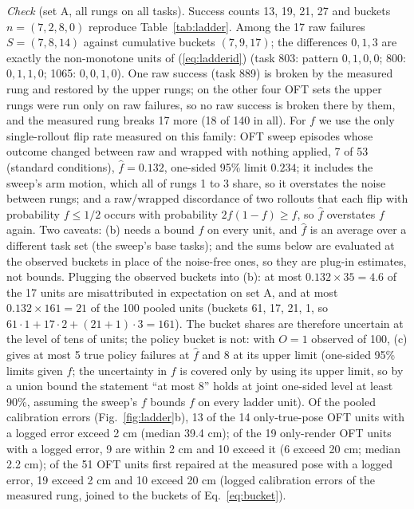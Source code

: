 \documentclass{article}
\begin{document}
\emph{Check} (set A, all rungs on all tasks).
Success counts 13, 19, 21, 27 and buckets $n = (7, 2, 8, 0)$ reproduce Table~\ref{tab:ladder}. Among the 17 raw
failures $S = (7, 8, 14)$ against cumulative buckets $(7, 9, 17)$; the differences $0, 1, 3$ are exactly the
non-monotone units of (\ref{eq:ladderid}) (task 803: pattern $0,1,0,0$; 800: $0,1,1,0$; 1065: $0,0,1,0$). One raw
success (task 889) is broken by the measured rung and restored by the upper rungs; on the other four OFT sets the upper
rungs were run only on raw failures, so no raw success is broken there by them, and the measured rung breaks 17 more
(18 of 140 in all). For $f$ we
use the only single-rollout flip rate measured on this family: OFT sweep episodes whose outcome changed between raw and
wrapped with nothing applied, 7 of 53 (standard
conditions), $\hat f = 0.132$, one-sided 95\% limit $0.234$; it includes the sweep's arm motion, which all of rungs 1 to 3
share, so it overstates the noise between rungs; and a raw/wrapped discordance of two rollouts that each flip with
probability $f \le 1/2$ occurs with probability $2f(1-f) \ge f$, so $\hat f$ overstates $f$ again. Two caveats: (b)
needs a bound $f$ on every unit, and $\hat f$ is an average over a different task set (the sweep's base tasks); and the
sums below are evaluated at the observed buckets in place of the noise-free ones, so they are plug-in estimates, not
bounds. Plugging the observed buckets into (b): at most
$0.132 \times 35 = 4.6$ of the 17 units are misattributed in expectation on set A, and at most
$0.132 \times 161 = 21$ of the 100 pooled units (buckets 61, 17, 21, 1, so $61 \cdot 1 + 17 \cdot 2 + (21 + 1)
\cdot 3 = 161$). The bucket shares are
therefore uncertain at the level of tens of units; the policy bucket is not: with $O = 1$ observed of 100, (c) gives at
most 5 true policy failures at $\hat f$ and 8 at its upper limit (one-sided 95\% limits given $f$; the uncertainty in
$f$ is covered only by using its upper limit, so by a union bound the statement ``at most 8'' holds at joint one-sided
level at least 90\%, assuming the sweep's $f$ bounds $f$ on every ladder unit). Of the pooled calibration errors (Fig.~\ref{fig:ladder}b), 13 of the 14
only-true-pose OFT units with a logged error exceed 2 cm (median 39.4 cm); of the 19 only-render OFT units with a
logged error, 9 are within 2 cm and 10 exceed it (6 exceed 20 cm; median 2.2 cm); of the 51 OFT units first repaired
at the measured pose with a logged error, 19 exceed 2 cm and 10 exceed 20 cm (logged calibration errors of the measured rung, joined to the buckets of Eq.~\ref{eq:bucket}).
\end{document}

